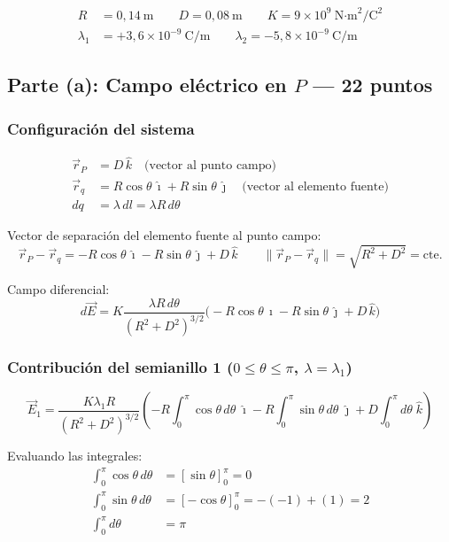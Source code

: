 \documentclass[12pt,letterpaper]{article}
\begin{document}
\begin{align*}
    R &= 0{,}14\ \text{m} \qquad D = 0{,}08\ \text{m} \qquad K = 9\times10^9\ \text{N·m}^2/\text{C}^2\\
    \lambda_1 &= +3{,}6\times10^{-9}\ \text{C/m} \qquad \lambda_2 = -5{,}8\times10^{-9}\ \text{C/m}
\end{align*}

\subsection*{Parte (a): Campo eléctrico en $P$ — 22 puntos}

\subsubsection*{Configuración del sistema}

\begin{align*}
    \vec{r}_P &= D\,\hat{k} \quad\text{(vector al punto campo)}\\
    \vec{r}_q &= R\cos\theta\,\hat{\imath} + R\sin\theta\,\hat{\jmath} \quad\text{(vector al elemento fuente)}\\
    dq &= \lambda\,dl = \lambda R\,d\theta
\end{align*}

Vector de separación del elemento fuente al punto campo:
\[
    \vec{r}_P - \vec{r}_q = -R\cos\theta\,\hat{\imath} - R\sin\theta\,\hat{\jmath} + D\,\hat{k}
    \qquad \|\vec{r}_P - \vec{r}_q\| = \sqrt{R^2+D^2} = \text{cte.}
\]

Campo diferencial:
\[
    d\vec{E} = K\frac{\lambda R\,d\theta}{(R^2+D^2)^{3/2}}
               \bigl(-R\cos\theta\,\hat{\imath} - R\sin\theta\,\hat{\jmath} + D\,\hat{k}\bigr)
\]

\subsubsection*{Contribución del semianillo 1 ($0\leq\theta\leq\pi$, $\lambda=\lambda_1$)}

\[
    \vec{E}_1 = \frac{K\lambda_1 R}{(R^2+D^2)^{3/2}}
    \left(-R\!\int_0^\pi\!\cos\theta\,d\theta\;\hat{\imath}
          -R\!\int_0^\pi\!\sin\theta\,d\theta\;\hat{\jmath}
          +D\!\int_0^\pi\!d\theta\;\hat{k}\right)
\]

Evaluando las integrales:
\begin{align*}
    \int_0^\pi \cos\theta\,d\theta &= [\sin\theta]_0^\pi = 0\\
    \int_0^\pi \sin\theta\,d\theta &= [-\cos\theta]_0^\pi = -(-1)+(1) = 2\\
    \int_0^\pi d\theta &= \pi
\end{align*}
\end{document}
